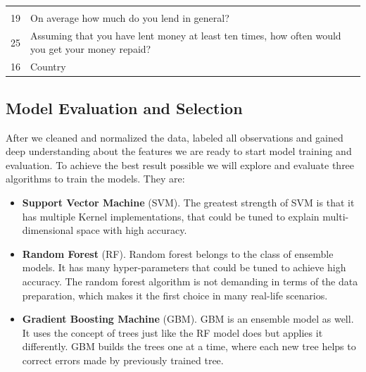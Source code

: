 \begin{longtable}[]{@{}ll@{}}
\begin{minipage}[t]{0.89\columnwidth}
\end{minipage}\tabularnewline
\begin{minipage}[t]{0.05\columnwidth}\raggedright
19\strut
\end{minipage} & \begin{minipage}[t]{0.89\columnwidth}\raggedright
On average how much do you lend in general?\strut
\end{minipage}\tabularnewline
\begin{minipage}[t]{0.05\columnwidth}\raggedright
25\strut
\end{minipage} & \begin{minipage}[t]{0.89\columnwidth}\raggedright
Assuming that you have lent money at least ten times, how often would
you get your money repaid?\strut
\end{minipage}\tabularnewline
\begin{minipage}[t]{0.05\columnwidth}\raggedright
16\strut
\end{minipage} & \begin{minipage}[t]{0.89\columnwidth}\raggedright
Country\strut
\end{minipage}\tabularnewline
\bottomrule
\end{longtable}

\hypertarget{model-evaluation-and-selection}{%
\subsection{Model Evaluation and
Selection}\label{model-evaluation-and-selection}}

After we cleaned and normalized the data, labeled all observations and
gained deep understanding about the features we are ready to start model
training and evaluation. To achieve the best result possible we will
explore and evaluate three algorithms to train the models. They are:

\begin{itemize}
\tightlist
\item
  \textbf{Support Vector Machine} (SVM). The greatest strength of SVM is
  that it has multiple Kernel implementations, that could be tuned to
  explain multi-dimensional space with high accuracy.
\item
  \textbf{Random Forest} (RF). Random forest belongs to the class of
  ensemble models. It has many hyper-parameters that could be tuned to
  achieve high accuracy. The random forest algorithm is not demanding in
  terms of the data preparation, which makes it the first choice in many
  real-life scenarios.
\item
  \textbf{Gradient Boosting Machine} (GBM). GBM is an ensemble model as
  well. It uses the concept of trees just like the RF model does but
  applies it differently. GBM builds the trees one at a time, where each
  new tree helps to correct errors made by previously trained tree.
\end{itemize}

